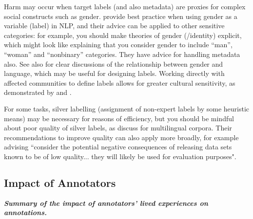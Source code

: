 Harm may occur when target labels (and also metadata) are proxies for complex social constructs such as gender. 
\citet{larson_gender_2017} provide best practice when using gender as a variable (label) in NLP, and their advice can be applied to other sensitive categories: for example, you should make theories of gender (/identity) explicit, which might look like explaining that you consider gender to include ``man'', ``woman'' and ``nonbinary'' categories. They have advice for handling metadata also.
See also \citet{savoldi_gender_2021, dev_harms_2021} for clear discussions of the relationship between gender and language, which may be useful for designing labels.
Working directly with affected communities to define labels allows for greater cultural sensitivity, as demonstrated by \citet{maronikolakis_listening_2022} and \citet{dev_building_2024}. %

For some tasks, silver labelling (assignment of non-expert labels by some heuristic means)  may be necessary for reasons of efficiency, but you should be mindful about poor quality of silver labels, as \citet{lignos_toward_2022} discuss for multilingual corpora.  Their recommendations to improve quality can also apply more broadly, for example advising ``consider the potential negative consequences of releasing data sets known to be of low quality... they will likely be used for evaluation purposes". 



\subsection{Impact of Annotators}
\noindent\textbf{\textit{Summary of the impact of annotators' lived experiences on annotations.}}
\newline 

